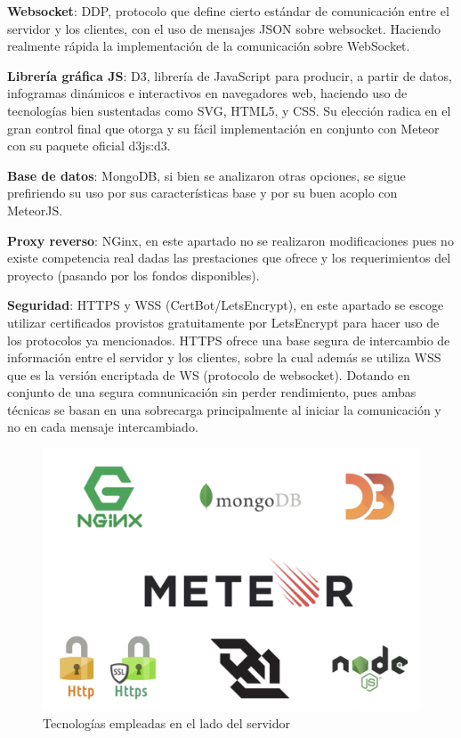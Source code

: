 \textbf{Websocket}: DDP\cite{ddp}, protocolo que define cierto estándar de comunicación entre el servidor y los clientes, con el uso de mensajes JSON sobre websocket. Haciendo realmente rápida la implementación de la comunicación sobre WebSocket.

\textbf{Librería gráfica JS}: D3, librería de JavaScript para producir, a partir de datos, infogramas dinámicos e interactivos en navegadores web, haciendo uso de tecnologías bien sustentadas como SVG, HTML5, y CSS. Su elección radica en el gran control final que otorga y su fácil implementación en conjunto con Meteor con su paquete oficial d3js:d3.

\textbf{Base de datos}: MongoDB\cite{mongodb}, si bien se analizaron otras opciones, se sigue prefiriendo su uso por sus características base y por su buen acoplo con MeteorJS.

\textbf{Proxy reverso}: NGinx\cite{nginx}, en este apartado no se realizaron modificaciones pues no existe competencia real dadas las prestaciones que ofrece y los requerimientos del proyecto (pasando por los fondos disponibles). \newline

\textbf{Seguridad}: HTTPS y WSS (CertBot/LetsEncrypt)\cite{certbot}\cite{nginx_certbot}, en este apartado se escoge utilizar certificados provistos gratuitamente por LetsEncrypt para hacer uso de los protocolos ya mencionados. HTTPS ofrece una base segura de intercambio de información entre el servidor y los clientes, sobre la cual además se utiliza WSS que es la versión encriptada de WS (protocolo de websocket). Dotando en conjunto de una segura comnunicación sin perder rendimiento, pues ambas técnicas se basan en una sobrecarga principalmente al iniciar la comunicación y no en cada mensaje intercambiado.

\begin{figure}[H]
	\centering
	\includegraphics[scale=0.6]{figuras/protof/tecnologias.png}
	\caption{Tecnologías empleadas en el lado del servidor}
	\label{tecnologias}
\end{figure}


